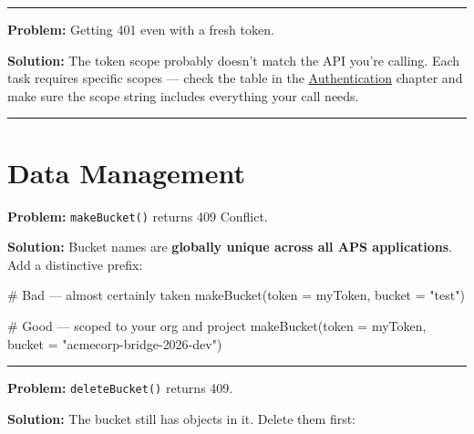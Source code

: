\documentclass[
  11pt,
  letterpaper,
  DIV=11,
  numbers=noendperiod]{scrreprt}
\newenvironment{Shaded}{\begin{snugshade}}{\end{snugshade}}
\newcommand{\AttributeTok}[1]{\textcolor[rgb]{0.40,0.45,0.13}{#1}}
\newcommand{\CommentTok}[1]{\textcolor[rgb]{0.37,0.37,0.37}{#1}}
\newcommand{\FunctionTok}[1]{\textcolor[rgb]{0.28,0.35,0.67}{#1}}
\newcommand{\NormalTok}[1]{\textcolor[rgb]{0.00,0.23,0.31}{#1}}
\newcommand{\StringTok}[1]{\textcolor[rgb]{0.13,0.47,0.30}{#1}}
\begin{document}
\begin{center}\rule{0.5\linewidth}{0.5pt}\end{center}

\textbf{Problem:} Getting 401 even with a fresh token.

\textbf{Solution:} The token scope probably doesn't match the API you're
calling. Each task requires specific scopes --- check the table in the
\hyperref[scopes--only-ask-for-what-you-need]{Authentication} chapter
and make sure the scope string includes everything your call needs.

\begin{center}\rule{0.5\linewidth}{0.5pt}\end{center}

\section{Data Management}\label{data-management-2}

\textbf{Problem:} \texttt{makeBucket()} returns 409 Conflict.

\textbf{Solution:} Bucket names are \textbf{globally unique across all
APS applications}. Add a distinctive prefix:

\begin{Shaded}
\begin{Highlighting}[]
\CommentTok{\# Bad — almost certainly taken}
\FunctionTok{makeBucket}\NormalTok{(}\AttributeTok{token =}\NormalTok{ myToken, }\AttributeTok{bucket =} \StringTok{"test"}\NormalTok{)}

\CommentTok{\# Good — scoped to your org and project}
\FunctionTok{makeBucket}\NormalTok{(}\AttributeTok{token =}\NormalTok{ myToken, }\AttributeTok{bucket =} \StringTok{"acmecorp{-}bridge{-}2026{-}dev"}\NormalTok{)}
\end{Highlighting}
\end{Shaded}

\begin{center}\rule{0.5\linewidth}{0.5pt}\end{center}

\textbf{Problem:} \texttt{deleteBucket()} returns 409.

\textbf{Solution:} The bucket still has objects in it. Delete them
first:
\end{document}
